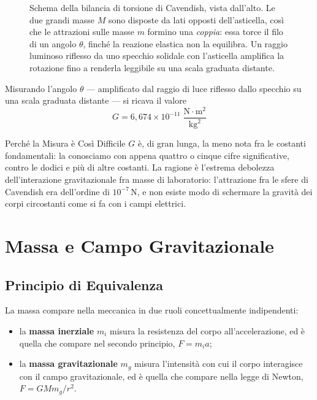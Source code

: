 \begin{figure}[ht]
    \caption{Schema della bilancia di torsione di Cavendish, vista dall'alto. Le due grandi masse $M$ sono disposte da lati opposti dell'asticella, così che le attrazioni sulle masse $m$ formino una \emph{coppia}: essa torce il filo di un angolo $\theta$, finché la reazione elastica non la equilibra. Un raggio luminoso riflesso da uno specchio solidale con l'asticella amplifica la rotazione fino a renderla leggibile su una scala graduata distante.}
    \label{fig:cavendish}
\end{figure}

Misurando l'angolo $\theta$ --- amplificato dal raggio di luce riflesso dallo specchio su una scala graduata distante --- si ricava il valore
\begin{equation}
    G = 6{,}674 \times 10^{-11} \; \frac{\mathrm{N} \cdot \mathrm{m}^2}{\mathrm{kg}^2}
\end{equation}

\begin{osservazione}{Perché la Misura è Così Difficile}
$G$ è, di gran lunga, la meno nota fra le costanti fondamentali: la conosciamo con appena quattro o cinque cifre significative, contro le dodici e più di altre costanti. La ragione è l'estrema debolezza dell'interazione gravitazionale fra masse di laboratorio: l'attrazione fra le sfere di Cavendish era dell'ordine di $10^{-7} \, \mathrm{N}$, e non esiste modo di schermare la gravità dei corpi circostanti come si fa con i campi elettrici.
\end{osservazione}

\section{Massa e Campo Gravitazionale}

\subsection{Principio di Equivalenza}

La massa compare nella meccanica in due ruoli concettualmente indipendenti:
\begin{itemize}
    \item la \textbf{massa inerziale} $m_i$ misura la resistenza del corpo all'accelerazione, ed è quella che compare nel secondo principio, $F = m_i a$;
    \item la \textbf{massa gravitazionale} $m_g$ misura l'intensità con cui il corpo interagisce con il campo gravitazionale, ed è quella che compare nella legge di Newton, $F = G M m_g / r^2$.
\end{itemize}

